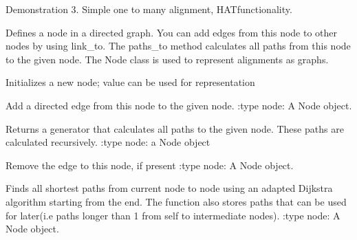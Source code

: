 \documentclass[letterpaper,10pt,english]{sphinxmanual}
\begin{document}

\begin{fulllineitems}
\label{alignments:alignments.HAT_demo}
Demonstration 3. Simple one to many alignment, HATfunctionality.

\end{fulllineitems}


\begin{fulllineitems}
\label{alignments:alignments.Node}
Defines a node in a directed graph.
You can add edges from this node to
other nodes by using link\_to. The
paths\_to method calculates all paths
from this node to the given node.
The Node class is used to represent alignments as
graphs.

Initializes a new node; value
can be used for representation

\begin{fulllineitems}
\label{alignments:alignments.Node.link_to}
Add a directed edge from this node to
the given node.
:type node:     A Node object.

\end{fulllineitems}


\begin{fulllineitems}
\label{alignments:alignments.Node.paths_to}
Returns a generator that calculates all
paths to the given node. These paths
are calculated recursively.
:type node:     a Node object

\end{fulllineitems}


\begin{fulllineitems}
\label{alignments:alignments.Node.remove_link}
Remove the edge to this node, if
present
:type node: A Node object.

\end{fulllineitems}


\begin{fulllineitems}
\label{alignments:alignments.Node.shortest_paths_to}
Finds all shortest paths from current node
to node using an adapted Dijkstra algorithm
starting from the end.
The function also stores paths that can be
used for later(i.e paths longer than 1
from self to intermediate nodes).
:type node:     A Node object.

\end{fulllineitems}


\end{fulllineitems}
\end{document}
